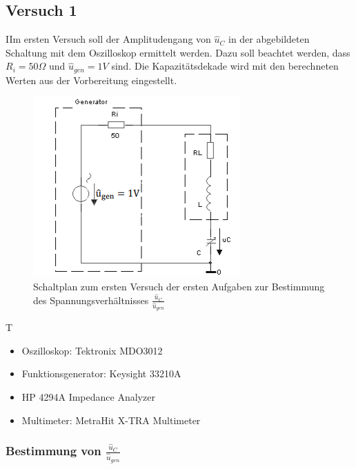 \documentclass{article}
\begin{document}
\subsection{Versuch 1}
\begin{task}
  IIm ersten Versuch soll der Amplitudengang von $\hat{u}_C$ in der abgebildeten Schaltung mit dem Oszilloskop ermittelt werden. Dazu soll beachtet werden,
  dass $R_i = 50\Omega$ und $\hat{u}_{gen} = 1V$ sind. Die Kapazitätsdekade wird mit den berechneten Werten aus der Vorbereitung eingestellt.
\end{task}

\begin{figure}[h]
  \begin{center}
    \includegraphics{../assets/images/ETP3/Versuch1Schaltplan.PNG}
    \caption{Schaltplan zum ersten Versuch der ersten Aufgaben zur Bestimmung des Spannungsverhältnisses $\frac{\hat{u}_C}{\hat{u}_{gen}}$}
  \end{center}
\end{figure}

\begin{devlist}
  T
  \begin{itemize}
    \item Oszilloskop: Tektronix MDO3012
    \item Funktionsgenerator: Keysight 33210A
    \item HP 4294A Impedance Analyzer
    \item Multimeter: MetraHit X-TRA Multimeter
  \end{itemize}
\end{devlist}

\newpage

\subsubsection{Bestimmung von $\frac{\hat{u}_C}{\hat{u}_{gen}}$}
\end{document}
